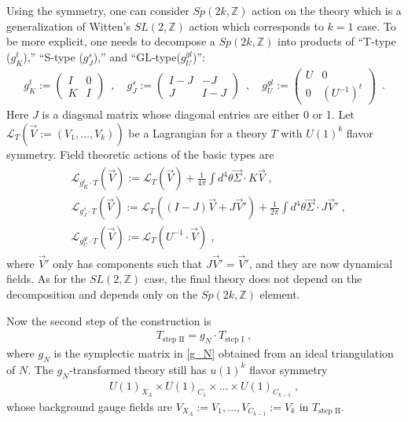 \documentclass[a4paper,11pt]{article}
\begin{document}
Using the symmetry, one can consider $Sp(2k,\mathbb{Z})$ action on the theory which is a generalization of Witten's $SL(2,\mathbb{Z})$ action \cite{Witten:2003ya} which corresponds to  $k=1$ case. To be more explicit, one needs to decompose a $Sp(2k,\mathbb{Z})$ into products of ``T-type ($g^t_K$),'' ``S-type ($g^s_{J}$),'' and ``GL-type($g^{gl}_U$)'': 
%
\begin{align}
g^t_K:= \left(\begin{array}{cc}I & 0 \\ K & I\end{array}\right)\ \;,  \quad g^s_J:= \left(\begin{array}{cc}I-J & -J \\ J & I-J\end{array}\right)\ \;,  \quad g^{gl}_U:= \left(\begin{array}{cc}U & 0 \\ 0 & (U^{-1})^t\end{array}\right)\ \;. \label{T,S and GL type}
\end{align}
%
Here $J$ is a diagonal matrix whose diagonal entries are either 0 or 1.
Let $\mathcal{L}_{T} (\vec{V}:=(V_1, \ldots, V_k))$ be a Lagrangian for a theory $T$ with $U(1)^k$ flavor symmetry. Field theoretic actions of the basic types  are
%
\begin{align}
\begin{split}
&\mathcal{L}_{g^t_K \cdot T} (\vec{V}) :=   \mathcal{L}_{T} (\vec{V}) + \frac{1}{4\pi } \int d^4\theta \vec{\Sigma} \cdot K \vec{V}\;,
\\
&\mathcal{L}_{g^s_J \cdot T} (\vec{V}) :=   \mathcal{L}_{T} ((I-J)\vec{V}+J\vec{V}') + \frac{1}{2\pi } \int d^4\theta \vec{\Sigma}\cdot J \vec{V}'\;,
\\
&\mathcal{L}_{g^{gl}_U \cdot T} (\vec{V}) :=   \mathcal{L}_{T} (U^{-1}\cdot\vec{V})\;,
\end{split}
\end{align}
%
where $\vec{V}'$ only has components such that $J\vec{V}'=\vec{V}'$, and they are now dynamical fields.
As for the $SL(2,\mathbb{Z})$ case, the final theory does not depend on the decomposition and depends only on the $Sp(2k,\mathbb{Z})$ element. 

Now the second step of the construction is 
%
\begin{align}
T_{\textrm{step II}} = g_N \cdot T_{\textrm{step I}}\;, \label{DGG : step 2}
\end{align}
%
where $g_N$ is the symplectic matrix in \eqref{g_N} obtained from an ideal triangulation of $N$. The $g_N$-transformed theory still has $u(1)^k$ flavor symmetry 
%
\begin{align}
U(1)_{X_A} \times U(1)_{C_1} \times \ldots \times U(1)_{C_{k-1}}\;,
\end{align}
%
whose background gauge fields are $V_{X_A}:=V_1,\ldots, V_{C_{k-1}}:=V_{k}$ in $T_{\textrm{step II}}$.
\end{document}
